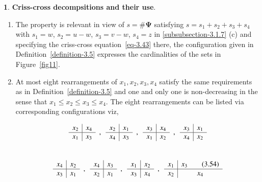 \documentclass[a4paper,12pt]{article}
\theoremstyle{definition}
\theoremstyle{underlinethm}
\theoremstyle{definition}
\newtheorem{subsubsec}{}[subsection]
\begin{document}
\begin{subsubsec}\label{subsubsection-3.1.8}
\textbf{Criss-cross decompsitions and their use}. 

\begin{enumerate}[label=(\alph*)]
\item The property is relevant in view of $s = \# \boldsymbol{\Psi}$ satisfying $s=s_{1} + s_{2} + s_{3} + s_{4}$ with $s_{1} = w$, $s_{2} = u-w$, $s_{3}=v-w$, $s_{4} =z$ in \eqref{subsubsection-3.1.7} (c) and specifying the criss-cross equation~\eqref{eq-3.43} there, the configuration given in Definition~\eqref{definition-3.5} expresses the cardinalities of the sets in Figure~\eqref{fig11}. 

\item At most eight rearrangements of $x_{1}, x_{2}, x_{3}, x_{4}$ satisfy the same requirements as in Definition~\eqref{definition-3.5} and one and only one is non-decreasing in the sense that $x_{1} \leq x_{2} \leq x_{3} \leq x_{4}$. The eight rearrangements can be listed via corresponding configurations viz,

\begin{equation}
\begin{array}{c|c}
x_{2} & x_{4}\nonumber\\\hline
x_{1} & x_{3}
\end{array}\\~~,~~
\begin{array}{c|c}
x_{2} & x_{1}\nonumber\\\hline
x_{4} & x_{3}
\end{array}\\~~,~~
\begin{array}{c|c}
x_{3} & x_{4}\nonumber\\\hline
x_{1} & x_{2}
\end{array}\\~~,~~
\begin{array}{c|c}
x_{3} & x_{1}\nonumber\\\hline
x_{4} & x_{2}
\end{array}
\end{equation}\\[-8pt]
\begin{equation}
\begin{array}{c|c}
x_{4} & x_{2}\nonumber\\\hline
x_{3} & x_{1}
\end{array}\\~~,~~
\begin{array}{c|c}
x_{4} & x_{3}\nonumber\\\hline
x_{2} & x_{1}
\end{array}\\~~,~~
\begin{array}{c|c}
x_{1} & x_{2}\nonumber\\\hline
x_{3} & x_{4}
\end{array}\\~~,~~
\begin{array}{c|c}
x_{1} & x_{3}\tag{3.54}\label{eq-3.54}\\\hline
x_{2} & x_{4}
\end{array}
\end{equation}


\end{enumerate}
\end{subsubsec}
\end{document}
